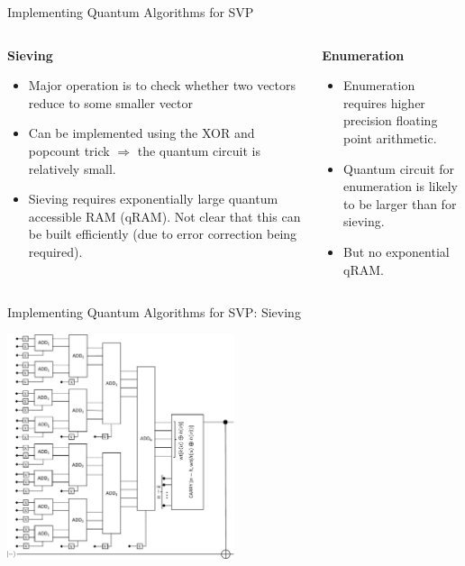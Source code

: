 \documentclass[xcolor=table,10pt,aspectratio=169]{beamer}
\begin{document}
\begin{frame}[label={sec:orgae3235d}]{Implementing Quantum Algorithms for SVP}
\begin{columns}[t]
\begin{column}{0.5\columnwidth}
\textbf{Sieving}

\begin{itemize}
\item Major operation is to check whether two vectors reduce to some smaller vector
\item Can be implemented using the XOR and popcount trick \(\Rightarrow\) the quantum circuit is relatively small.
\item Sieving requires exponentially large quantum accessible RAM (qRAM). Not clear that this can be built efficiently (due to error correction being required).
\end{itemize}
\end{column}

\begin{column}{0.5\columnwidth}
\textbf{Enumeration}

\begin{itemize}
\item Enumeration requires higher precision floating point arithmetic.
\item Quantum circuit for enumeration is likely to be larger than for sieving.
\item But no exponential qRAM.
\end{itemize}
\end{column}
\end{columns}
\end{frame}

\begin{frame}[label={sec:orga96e46c}]{Implementing Quantum Algorithms for SVP: Sieving}
\begin{center}
\includegraphics[width=0.5\textwidth]{./popcount-quantum-circuit.pdf}
\end{center}
\end{frame}
\end{document}
